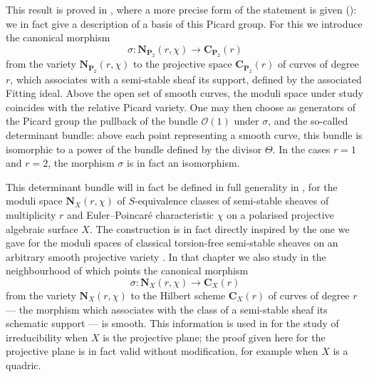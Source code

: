 \documentclass[12pt,english]{smfart}%
\theoremstyle{plain}
\theoremstyle{definition}
\theoremstyle{remark}
\newcommand{\PP}{\mathbf{P}}
\newcommand{\NN}{\mathbf{N}}           %
\newcommand{\CX}{\mathbf{C}}           %
\newcommand{\Oh}{\mathcal{O}}
\newcommand{\origpage}[1]{\marginnote{\scriptsize\itshape p.~#1}}
\begin{document}
This result is proved in , where a more precise form of the statement is given (): we in fact give a description of a basis of this Picard group. For this we introduce the canonical morphism
\[
\sigma : \NN_{\PP_{2}}(r,\chi) \longrightarrow \CX_{\PP_{2}}(r)
\]
from the variety $\NN_{\PP_{2}}(r,\chi)$ to the projective space $\CX_{\PP_{2}}(r)$ of curves of degree $r$, which associates with a semi-stable sheaf its support, defined by the associated Fitting ideal. Above the open set of smooth curves, the moduli space under study coincides with the relative Picard variety. One may then choose as generators of the Picard group the pullback of the bundle $\Oh(1)$ under $\sigma$, and the so-called determinant bundle: above each point representing a smooth curve, this bundle is isomorphic to a power of the bundle defined by the divisor $\Theta$. In the cases $r=1$ and $r=2$, the morphism $\sigma$ is in fact an isomorphism.

This determinant bundle will in fact be defined in full generality in , for the moduli space $\NN_{X}(r,\chi)$ of $S$-equivalence classes of semi-stable sheaves of multiplicity $r$ and Euler--Poincar\'e characteristic $\chi$ on a polarised projective algebraic surface $X$. The construction is in fact directly inspired by the one we gave for the moduli spaces of classical torsion-free semi-stable sheaves on an arbitrary smooth projective variety \cite{LeP5}.
\origpage{636}
In that chapter we also study in the neighbourhood of which points the canonical morphism
\[
\sigma : \NN_{X}(r,\chi) \longrightarrow \CX_{X}(r)
\]
from the variety $\NN_{X}(r,\chi)$ to the Hilbert scheme $\CX_{X}(r)$ of curves of degree $r$ --- the morphism which associates with the class of a semi-stable sheaf its schematic support --- is smooth. This information is used in  for the study of irreducibility when $X$ is the projective plane; the proof given here for the projective plane is in fact valid without modification, for example when $X$ is a quadric.
\end{document}
